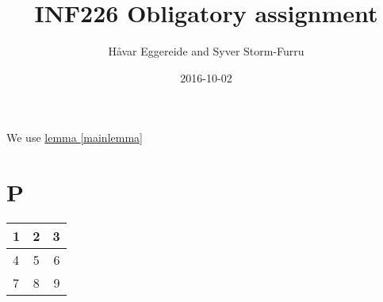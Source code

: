 \documentclass[a4paper]{report}
\title{INF226 Obligatory assignment}
\date{2016-10-02}
\author{Håvar Eggereide and Syver Storm-Furru}
\begin{document}
We use \hyperref[mainlemma]{lemma \ref*{mainlemma}}
\chapter{P} 

\begin{center}
\begin{tabular}{| l | c | r |}
  \hline
  1 & 2 & 3 \\ \hline
  4 & 5 & 6 \\ \hline 
  7 & 8 & 9 \\ 
  \hline

\end{tabular}
\end{center}
\end{document}
